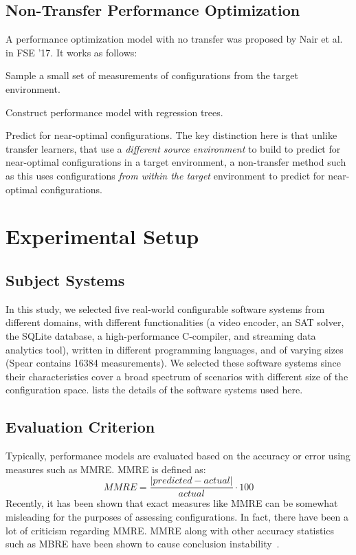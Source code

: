 \documentclass[10pt,journal,compsoc]{IEEEtran}
\begin{document}
\subsection{Non-Transfer Performance Optimization}
\label{sect:nair}
A performance optimization model with no transfer was proposed by Nair et al.~\cite{nair2017using} in FSE '17. It works as follows: 
\be[leftmargin=*]
\item Sample a small set of measurements of configurations from the target environment.
\item Construct performance model with regression trees. 
\item Predict for near-optimal configurations. 
\ee
The key distinction here is that unlike transfer learners, that use a \textit{different source environment} to build to predict for near-optimal configurations in a target environment, a non-transfer method such as this uses configurations \textit{from within the target} environment to predict for near-optimal configurations. 

\section{Experimental Setup}
\label{sect:expt}
\subsection{Subject Systems}
\label{sect:datasets}
In this study, we selected five real-world configurable software systems from different domains, with different functionalities (a video encoder, an SAT solver, the SQLite database, a high-performance C-compiler, and streaming data analytics tool), written in different programming languages, and of varying sizes (Spear contains 16384 measurements). We selected these software systems since their characteristics cover a broad spectrum of scenarios with different size of the configuration space.  lists the details of the software systems used here.

\subsection{Evaluation Criterion}
\label{sect:eval}
Typically, performance models are evaluated based on the accuracy or error using measures such as MMRE. 
 MMRE is defined as:
\[
    MMRE = \frac{|predicted-actual|}{actual} \cdot 100
\]
Recently, it has been shown that exact measures like MMRE
can be somewhat misleading for the purposes of assessing
configurations.
In fact, there have been a lot of criticism regarding MMRE. MMRE along with other accuracy statistics such as MBRE have been shown to cause conclusion instability~\cite{myrtveit2012validity, myrtveit2005reliability, foss2003simulation}.
\end{document}
